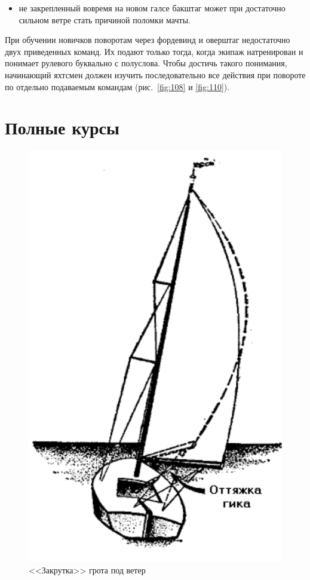 \documentclass[a4paper, 12pt, twoside, final]{scrbook}
\begin{document}
\begin{itemize}
\item не закрепленный вовремя на новом галсе бакштаг может при достаточно сильном ветре стать причиной поломки мачты.
\end{itemize}

При обучении новичков поворотам через фордевинд и оверштаг недостаточно двух приведенных команд. Их подают только тогда, когда экипаж натренирован и понимает рулевого буквально с полуслова. Чтобы достичь такого понимания, начинающий яхтсмен должен изучить последовательно все действия при повороте по отдельно подаваемым командам (рис.~\ref{fig:108} и \ref{fig:110}).

\section{Полные курсы}

\begin{figure}
	\centering
	\includegraphics[scale=1]{112_Zakrutka_grota_na_veter}
	\caption{<<Закрутка>> грота под ветер}
	\label{fig:112}
\end{figure}
\end{document}
